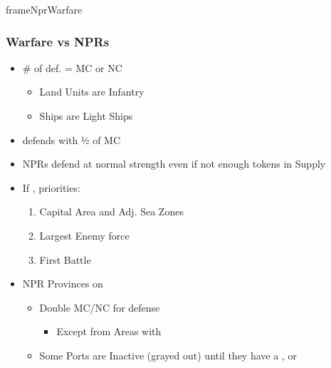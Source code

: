 \documentclass[10pt]{article}
\begin{document}
\begin{dynamiccontents*}{frameNprWarfare}
	\subsubsection*{Warfare vs NPRs }
	\begin{itemize}
		\item \# of def.  = MC or NC
		\begin{itemize}
			\item Land Units are Infantry
			\item Ships are Light Ships
		\end{itemize}
		\item {} defends with ½ of MC
		\item NPRs defend at normal strength even if not enough tokens in Supply
		\item If , priorities:
		\begin{enumerate}
			\item Capital Area and Adj. Sea Zones
			\item Largest Enemy force
			\item First Battle
		\end{enumerate}
		\item NPR Provinces on 
		\begin{itemize}
			\item Double MC/NC for defense
			\begin{itemize}
				\item Except from Areas with \plague
			\end{itemize}
			\item Some Ports are Inactive (grayed out) until they have a \dnpr, \town or \vassal
		\end{itemize}
	\end{itemize}
\end{dynamiccontents*}
\end{document}
